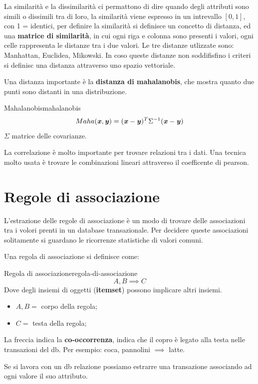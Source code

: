 \documentclass[12pt]{article}
\begin{document}
La similarit\`a e la dissimilarit\`a ci permattono di dire quando degli attributi sono simili o dissimili tra di loro, la similarit\`a viene espresso in un intrevallo $[0, 1]$, con 1 = identici, per definire la similarit\`a si definisce un concetto di distanza, ed una \textbf{matrice di similarit\`a}, in cui ogni riga e colonna sono presenti i valori, ogni celle rappresenta le distanze tra i due valori. Le tre distanze utlizzate sono: Manhattan, Euclidea, Mikowski. In coso queste distanze non soddifisfino i criteri si definisc una distanza attraverso uno spazio vettoriale.

Una distanza importante \`e la \textbf{distanza di mahalanobis}, che mostra quanto due punti sono distanti in una distribuzione.
\begin{theorem}{Mahalanobis}{mahalanobis}
    \[ Maha(\textbf{\textit{x}}, \textbf{\textit{y}}) = (\textbf{\textit{x}} - \textbf{\textit{y}})^{T} \Sigma^{-1} (\textbf{\textit{x}} - \textbf{\textit{y}}) \]
    $\Sigma$ matrice delle covarianze.
\end{theorem}

La correlazione \`e molto importante per trovare relazioni tra i dati. Una tecnica molto usata \`e trovare le combinazioni lineari attraverso il coefficente di pearson.



\newpage
\section{Regole di associazione}
L'estrazione delle regole di associazione \`e un modo di trovare delle associazioni tra i volori prenti in un database transazionale. Per decidere queste associazioni solitamente si guardano le ricorrenze statistiche di valori comuni.

Una regola di associazione si definisce come:
\begin{theorem}{Regola di associazione}{regola-di-associazione}
    \[ A, B \implies C \]
    Dove degli insiemi di oggetti (\textbf{itemset}) possono implicare altri insiemi.
    \begin{itemize}
        \item $A, B =$ corpo della regola;
        \item $C =$ testa della regola;
    \end{itemize}
    La freccia indica la \textbf{co-occorrenza}, indica che il copro \`e legato alla testa nelle transazioni del db. Per esempio: coca, pannolini $ \implies $ latte.
\end{theorem}

Se si lavora con un db relazione possiamo estrarre una transazione associando ad ogni valore il suo attributo.
\end{document}
